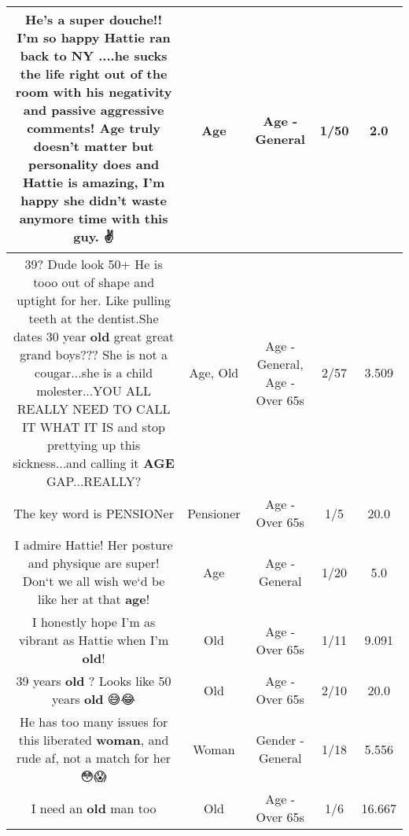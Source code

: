 \documentclass[11pt]{article}
\newlength\mylength
\begin{document}
\begin{center}
\begin{longtable}{|C{.65\mylength}|C{.30\mylength}|C{.12\mylength}|C{.12\mylength}|C{.12\mylength}|}
  \small He's a super douche!! I'm so happy Hattie ran back to NY ....he sucks the life right out of the room with his negativity and passive aggressive comments! \textbf{Age} truly doesn't matter but personality does and Hattie is amazing, I'm happy she didn't waste anymore time with this guy. ✌️\normalsize   & Age & Age - General & 1/50 & 2.0 \\  \hline
  \small 39? Dude look 50+ He is tooo out of shape and uptight for her. Like pulling teeth at the dentist.She dates 30 year \textbf{old} great great grand boys??? She is not a cougar...she is a child molester...YOU ALL REALLY NEED TO CALL IT WHAT IT IS and stop prettying up this sickness...and calling it \textbf{AGE} GAP...REALLY?\normalsize   & Age, Old & Age - General, Age - Over 65s & 2/57 & 3.509 \\  \hline
  \small The key word is PENSIONer\normalsize   & Pensioner & Age - Over 65s & 1/5 & 20.0 \\  \hline
  \small I admire Hattie! Her posture and physique are super! Don`t we all wish we`d be like her at that \textbf{age}!\normalsize   & Age & Age - General & 1/20 & 5.0 \\  \hline
  \small I honestly hope I'm as vibrant as Hattie when I'm \textbf{old}!\normalsize   & Old & Age - Over 65s & 1/11 & 9.091 \\  \hline
  \small 39 years \textbf{old} ? Looks like 50 years \textbf{old} 😅😂\normalsize   & Old & Age - Over 65s & 2/10 & 20.0 \\  \hline
  \small He has too many issues for this liberated \textbf{woman}, and rude af, not a match for her 😳😱\normalsize   & Woman & Gender - General & 1/18 & 5.556 \\  \hline
  \small I need an \textbf{old} man too\normalsize   & Old & Age - Over 65s & 1/6 & 16.667 \\  \hline

\end{longtable}
\end{center}
\end{document}
